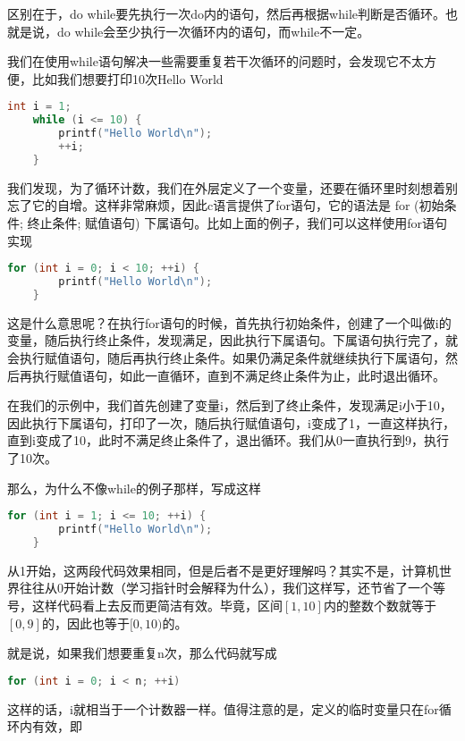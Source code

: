 区别在于，do while要先执行一次do内的语句，然后再根据while判断是否循环。也就是说，do while会至少执行一次循环内的语句，而while不一定。

我们在使用while语句解决一些需要重复若干次循环的问题时，会发现它不太方便，比如我们想要打印10次Hello World

\begin{lstlisting}[language=C]
    int i = 1;
    while (i <= 10) {
        printf("Hello World\n");
        ++i;
    }
\end{lstlisting}

我们发现，为了循环计数，我们在外层定义了一个变量，还要在循环里时刻想着别忘了它的自增。这样非常麻烦，因此c语言提供了for语句，它的语法是 for (初始条件; 终止条件; 赋值语句) 下属语句。比如上面的例子，我们可以这样使用for语句实现

\begin{lstlisting}[language=C]
    for (int i = 0; i < 10; ++i) {
        printf("Hello World\n");
    }
\end{lstlisting}

这是什么意思呢？在执行for语句的时候，首先执行初始条件，创建了一个叫做i的变量，随后执行终止条件，发现满足，因此执行下属语句。下属语句执行完了，就会执行赋值语句，随后再执行终止条件。如果仍满足条件就继续执行下属语句，然后再执行赋值语句，如此一直循环，直到不满足终止条件为止，此时退出循环。

在我们的示例中，我们首先创建了变量i，然后到了终止条件，发现满足i小于10，因此执行下属语句，打印了一次，随后执行赋值语句，i变成了1，一直这样执行，直到i变成了10，此时不满足终止条件了，退出循环。我们从0一直执行到9，执行了10次。

那么，为什么不像while的例子那样，写成这样

\begin{lstlisting}[language=C]
    for (int i = 1; i <= 10; ++i) {
        printf("Hello World\n");
    }
\end{lstlisting}

从1开始，这两段代码效果相同，但是后者不是更好理解吗？其实不是，计算机世界往往从0开始计数（学习指针时会解释为什么），我们这样写，还节省了一个等号，这样代码看上去反而更简洁有效。毕竟，区间$[1, 10]$内的整数个数就等于$[0, 9]$的，因此也等于$[0, 10)$的。

就是说，如果我们想要重复n次，那么代码就写成

\begin{lstlisting}[language=C]
    for (int i = 0; i < n; ++i)
\end{lstlisting}

这样的话，i就相当于一个计数器一样。值得注意的是，定义的临时变量只在for循环内有效，即


